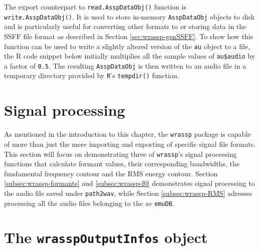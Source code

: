 \documentclass[
]{book}
\newenvironment{Shaded}{\begin{snugshade}}{\end{snugshade}}
\newcommand{\CommentTok}[1]{\textcolor[rgb]{0.56,0.35,0.01}{\textit{#1}}}
\newcommand{\FloatTok}[1]{\textcolor[rgb]{0.00,0.00,0.81}{#1}}
\newcommand{\FunctionTok}[1]{\textcolor[rgb]{0.00,0.00,0.00}{#1}}
\newcommand{\NormalTok}[1]{#1}
\newcommand{\OtherTok}[1]{\textcolor[rgb]{0.56,0.35,0.01}{#1}}
\newcommand{\SpecialCharTok}[1]{\textcolor[rgb]{0.00,0.00,0.00}{#1}}
\newcommand{\StringTok}[1]{\textcolor[rgb]{0.31,0.60,0.02}{#1}}
\begin{document}
The export counterpart to \texttt{read.AsspDataObj()} function is \texttt{write.AsspDataObj()}. It is used to store in-memory \texttt{AsspDataObj} objects to disk and is particularly useful for converting other formats to or storing data in the SSFF file format as described in Section \ref{sec:wrassp-genSSFF}. To show how this function can be used to write a slightly altered version of the \texttt{au} object to a file, the R code snippet below initially multiplies all the sample values of \texttt{au\$audio} by a factor of \texttt{0.5}. The resulting \texttt{AsspDataObj} is then written to an audio file in a temporary directory provided by \texttt{R}'s \texttt{tempdir()} function.

\begin{Shaded}
\end{Shaded}

\hypertarget{signal-processing}{%
\section{Signal processing}\label{signal-processing}}

As mentioned in the introduction to this chapter, the \texttt{wrassp} package is capable of more than just the mere importing and exporting of specific signal file formats. This section will focus on demonstrating three of \texttt{wrassp}'s signal processing functions that calculate formant values, their corresponding bandwidths, the fundamental frequency contour and the RMS energy contour. Section \ref{subsec:wrassp-formants} and \ref{subsec:wrassp-f0} demonstrates signal processing to the audio file saved under \texttt{path2wav}, while Section \ref{subsec:wrassp-RMS} adresses processing all the audio files belonging to the \emph{ae} \texttt{emuDB}.

\hypertarget{subsec:wrassp-wrasspOutputInfos}{%
\section{\texorpdfstring{The \texttt{wrasspOutputInfos} object}{The wrasspOutputInfos object}}\label{subsec:wrassp-wrasspOutputInfos}}
\end{document}
